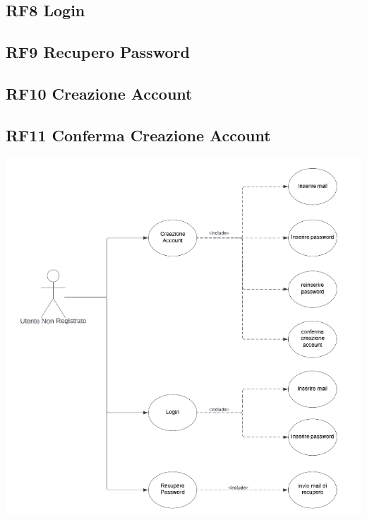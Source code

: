\documentclass{article}
\begin{document}
\subsection{RF8 Login}
\subsection{RF9 Recupero Password}
\subsection{RF10 Creazione Account}
\subsection{RF11 Conferma Creazione Account}
\begin{center}
    \item[] \includegraphics[scale=0.5]{UseCase_3.png}
\end{center}
\end{document}
